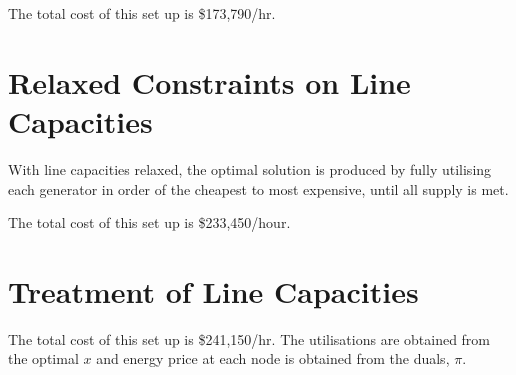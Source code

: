 \documentclass[11pt]{article}
\begin{document}
The total cost of this set up is \$173,790/hr.

\section*{Relaxed Constraints on Line Capacities}
With line capacities relaxed, the optimal solution is produced by fully utilising each generator in order of the cheapest to most expensive, until all supply is met. 

The total cost of this set up is \$233,450/hour.  

\section*{Treatment of Line Capacities}

The total cost of this set up is \$241,150/hr. The utilisations are obtained from the optimal $x$ and energy price at each node is obtained from the duals, $\pi$.
\end{document}
